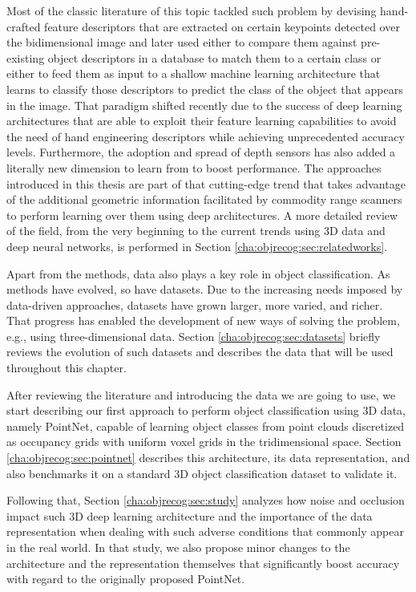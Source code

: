 Most of the classic literature of this topic tackled such problem by devising hand-crafted feature descriptors that are extracted on certain keypoints detected over the bidimensional image and later used either to compare them against pre-existing object descriptors in a database to match them to a certain class or either to feed them as input to a shallow machine learning architecture that learns to classify those descriptors to predict the class of the object that appears in the image. That paradigm shifted recently due to the success of deep learning architectures that are able to exploit their feature learning capabilities to avoid the need of hand engineering descriptors while achieving unprecedented accuracy levels. Furthermore, the adoption and spread of depth sensors has also added a literally new dimension to learn from to boost performance. The approaches introduced in this thesis are part of that cutting-edge trend that takes advantage of the additional geometric information facilitated by commodity range scanners to perform learning over them using deep architectures. A more detailed review of the field, from the very beginning to the current trends using 3D data and deep neural networks, is performed in Section \ref{cha:objrecog:sec:relatedworks}.

Apart from the methods, data also plays a key role in object classification. As methods have evolved, so have datasets. Due to the increasing needs imposed by data-driven approaches, datasets have grown larger, more varied, and richer. That progress has enabled the development of new ways of solving the problem, e.g., using three-dimensional data. Section \ref{cha:objrecog:sec:datasets} briefly reviews the evolution of such datasets and describes the data that will be used throughout this chapter. 

After reviewing the literature and introducing the data we are going to use, we start describing our first approach to perform object classification using 3D data, namely PointNet, capable of learning object classes from point clouds discretized as occupancy grids with uniform voxel grids in the tridimensional space. Section \ref{cha:objrecog:sec:pointnet} describes this architecture, its data representation, and also benchmarks it on a standard 3D object classification dataset to validate it.

Following that, Section \ref{cha:objrecog:sec:study} analyzes how noise and occlusion impact such 3D deep learning architecture and the importance of the data representation when dealing with such adverse conditions that commonly appear in the real world. In that study, we also propose minor changes to the architecture and the representation themselves that significantly boost accuracy with regard to the originally proposed PointNet.

